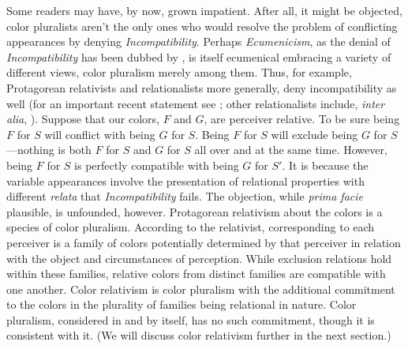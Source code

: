 \documentclass[12pt]{article}
\begin{document}
Some readers may have, by now, grown impatient. After all, it might be objected, color pluralists aren't the only ones who would resolve the problem of conflicting appearances by denying \emph{Incompatibility}. Perhaps \emph{Ecumenicism}, as the denial of \emph{Incompatibility} has been dubbed by \citet{Cohen:2009lq}, is itself ecumenical embracing a variety of different views, color pluralism merely among them. Thus, for example, Protagorean relativists and relationalists more generally, deny incompatibility as well (for an important recent statement see \citealt{Cohen:2009lq}; other relationalists include, \emph{inter alia}, \citealt{McGinn:1983kl,Thompson:1995fl,Matthen:1999ma,Cohen:2004ox,Matthen:2005md}). Suppose that our colors, \( F \) and \( G \), are perceiver relative. To be sure being \( F \) for \( S \) will conflict with being \( G \) for \( S \). Being \( F \) for \( S \) will exclude being \( G \) for \( S \)---nothing is both \( F \) for \( S \) and \( G \) for \( S \) all over and at the same time. However, being \( F \) for \( S \) is perfectly compatible with being \( G \) for \( S' \). It is because the variable appearances involve the presentation of relational properties with different \emph{relata} that \emph{Incompatibility} fails. The objection, while \emph{prima facie} plausible, is unfounded, however. Protagorean relativism about the colors is a species of color pluralism. According to the relativist, corresponding to each perceiver is a family of colors potentially determined by that perceiver in relation with the object and circumstances of perception. While exclusion relations hold within these families, relative colors from distinct families are compatible with one another. Color relativism is color pluralism with the additional commitment to the colors in the plurality of families being relational in nature. Color pluralism, considered in and by itself, has no such commitment, though it is consistent with it. (We will discuss color relativism further in the next section.)

\end{document}
